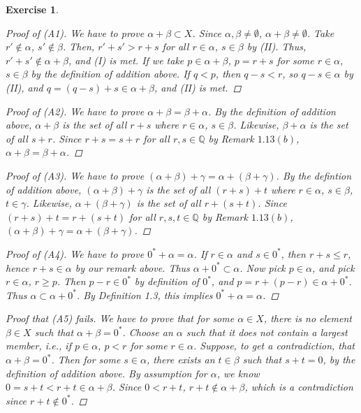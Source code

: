 \documentclass[10pt,letterpaper]{amsart}
\newtheorem{exercise}{Exercise}[section]
\theoremstyle{definition}
\theoremstyle{remark}
\numberwithin{equation}{exercise}
\begin{document}
\begin{multicols}{2}
\begin{exercise}
    \begin{proof}[Proof of \emph{(A1)}]
      We have to prove $\alpha + \beta \subset X$. Since $\alpha,\beta \ne \emptyset$, $\alpha + \beta \ne \emptyset$. Take $r' \notin \alpha$, $s' \notin \beta$. Then, $r' + s' > r + s$ for all $r \in \alpha$, $s \in \beta$ by (II). Thus, $r' + s' \notin \alpha + \beta$, and (I) is met. If we take $p \in \alpha + \beta$, $p = r + s$ for some $r \in \alpha$, $s \in \beta$ by the definition of addition above. If $q < p$, then $q - s < r$, so $q-s \in \alpha$ by (II), and $q = (q-s) + s \in \alpha + \beta$, and (II) is met.
    \end{proof}
    \begin{proof}[Proof of \emph{(A2)}]
      We have to prove $\alpha + \beta = \beta + \alpha$. By the definition of addition above, $\alpha + \beta$ is the set of all $r + s$ where $r \in \alpha$, $s \in \beta$. Likewise, $\beta + \alpha$ is the set of all $s + r$. Since $r + s = s + r$ for all $r,s \in \mathbb{Q}$ by Remark $1.13(b)$, $\alpha + \beta = \beta + \alpha$.
    \end{proof}
    \begin{proof}[Proof of \emph{(A3)}]
      We have to prove $(\alpha + \beta) + \gamma = \alpha + (\beta + \gamma)$. By the defintion of addition above, $(\alpha + \beta) + \gamma$ is the set of all $(r+s)+t$ where $r \in \alpha$, $s \in \beta$, $t \in \gamma$. Likewise, $\alpha + (\beta + \gamma)$ is the set of all $r+(s+t)$. Since $(r+s)+t = r+(s+t)$ for all $r,s,t \in \mathbb{Q}$ by Remark $1.13(b)$, $(\alpha + \beta) + \gamma = \alpha + (\beta + \gamma)$.
    \end{proof}
    \begin{proof}[Proof of \emph{(A4)}]
      We have to prove $0^* + \alpha = \alpha$. If $r \in \alpha$ and $s \in 0^*$, then $r + s \le r$, hence $r + s \in \alpha$ by our remark above. Thus $\alpha + 0^* \subset \alpha$. Now pick $p \in \alpha$, and pick $r \in \alpha$, $r \ge p$. Then $p - r \in 0^*$ by definition of $0^*$, and $p = r + (p-r) \in \alpha + 0^*$. Thus $\alpha \subset \alpha + 0^*$. By Definition 1.3, this implies $0^* + \alpha = \alpha$.
    \end{proof}
    \begin{proof}[Proof that \emph{(A5)} fails]
      We have to prove that for some $\alpha \in X$, there is no element $\beta \in X$ such that $\alpha + \beta = 0^*$. Choose an $\alpha$ such that it does not contain a largest member, i.e., if $p \in \alpha$, $p < r$ for some $r \in \alpha$. Suppose, to get a contradiction, that $\alpha + \beta = 0^*$. Then for some $s \in \alpha$, there exists an $t \in \beta$ such that $s + t = 0$, by the definition of addition above. By assumption for $\alpha$, we know $0 = s + t < r + t \in \alpha + \beta$. Since $0 < r+t$, $r+t \notin \alpha + \beta$, which is a contradiction since $r + t \notin 0^*$.
    \end{proof}
  \end{exercise}

\end{multicols}
\end{document}
